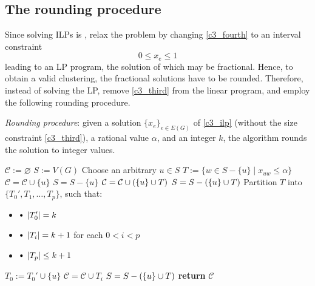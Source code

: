 \subsection{The rounding procedure}

Since solving ILPs is \NPHard, \textcite{c3} relax the problem by changing \cref{c3_fourth} to an interval constraint $$0 \le x_e \le 1$$ leading to an LP program, the solution of which may be fractional. Hence, to obtain a valid clustering, the fractional solutions have to be rounded. Therefore, instead of solving the LP, \textcite{c3} remove \cref{c3_third} from the linear program, and employ the following rounding procedure.

\begin{algorithm}[H]
    \caption{
        \textit{Rounding procedure}: given a solution $\{x_e\}_{e \in E(G)}$ of \cref{c3_ilp} (without the size constraint \cref{c3_third}), a rational value $\alpha$, and an integer $k$, the algorithm rounds the solution to integer values.
    }

        \label{rounding_procedure}
    \begin{algorithmic}[1]
            \State $\mathcal C := \varnothing$ 
            \State $S := V(G)$
                \State Choose an arbitrary $u \in S$ 
                \State $T := \{w \in S - \{u\} \mid x_{uw} \le \alpha\}$ 
                    \State $\mathcal C = \mathcal C \cup \{u\}$ 
                    \State $S = S - \{u\}$
                    \State $\mathcal C = \mathcal C \cup \left(\{u\} \cup T\right)$ 
                    \State $S = S - \left(\{u\} \cup T\right)$
                \Else
            \State Partition $T$ into $\{T_0', T_1, \ldots, T_p\}$, such that: \begin{itemize} \item[] \quad \quad \quad \quad $\sbullet \ \abs{T_0'} = k$ \item[] \quad \quad \quad \quad $\sbullet \ \abs{T_i} = k + 1$ for each $0 < i < p$ \item[] \quad \quad \quad \quad $\sbullet \ \abs{T_p} \le k + 1$ \end{itemize}
                    \State $T_0 := T_0' \cup \{u\}$ 
                        \State $\mathcal C = \mathcal C \cup T_i$ 
                    \EndFor
                    \State $S = S - \left(\{u\} \cup T\right)$
                \EndIf
            \EndWhile
            \State \textbf{return} $\mathcal C$
        \EndFunction
    \end{algorithmic}
\end{algorithm}

